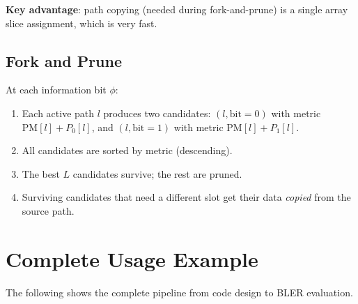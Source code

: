 \documentclass[11pt,a4paper]{article}
\begin{document}
\textbf{Key advantage}: path copying (needed during fork-and-prune) is a single array slice assignment, which is very fast.

\subsection{Fork and Prune}

At each information bit $\phi$:
\begin{enumerate}
    \item Each active path $l$ produces two candidates: $(l, \text{bit}=0)$ with metric $\text{PM}[l] + P_0[l]$, and $(l, \text{bit}=1)$ with metric $\text{PM}[l] + P_1[l]$.
    \item All candidates are sorted by metric (descending).
    \item The best $L$ candidates survive; the rest are pruned.
    \item Surviving candidates that need a different slot get their data \emph{copied} from the source path.
\end{enumerate}


\section{Complete Usage Example}
\label{sec:usage}

The following shows the complete pipeline from code design to BLER evaluation.
\end{document}
